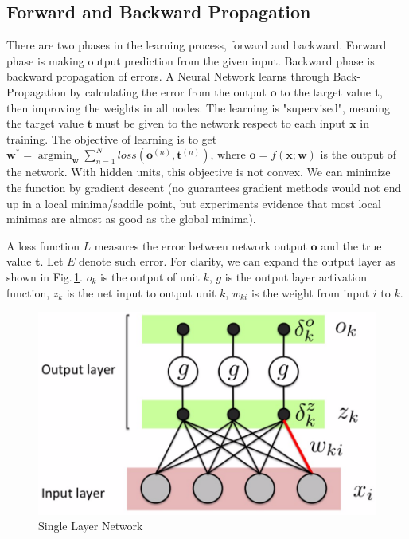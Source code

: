 \newcommand{\argminE}{\mathop{\mathrm{argmin}}}  

\subsection{Forward and Backward Propagation}
There are two phases in the learning process, forward and backward. Forward phase is making output prediction from the given input.
Backward phase is backward propagation of errors. A Neural Network learns through Back-Propagation by calculating the error from the output $\mathbf{o}$ to the target value $\mathbf{t}$, then improving the weights in all nodes. The learning is "supervised", meaning the target value $\mathbf{t}$ must be given to the network respect to each input  $\mathbf{x}$ in training. The objective of learning is to get $\mathbf{w}^* = \argminE_\mathbf{w} \sum_{n=1}^N loss(\mathbf{o}^{(n)},\mathbf{t}^{(n)})$, where $\mathbf{o} = f(\mathbf{x};\mathbf{w})$ is the output of the network. With hidden units, this objective is not convex. We can minimize the function by gradient descent (no guarantees gradient methods would not end up in a local minima/saddle point, but experiments evidence that most local minimas are almost as good as the global minima).

A loss function $L$ measures the error between network output $\mathbf{o}$ and the true value $\mathbf{t}$. Let $E$ denote such error. For clarity, we can expand the output layer as shown in Fig.\,\ref{expand2}. $o_k$ is the output of unit $k$, $g$ is the output layer activation function, $z_{k}$ is the net input to output unit $k$, $w_{ki}$ is the weight from input $i$ to $k$. 

\begin{figure}[h]
	\centering
	\includegraphics[scale=0.5]{Figs/singlelayer2.png}
    \caption{Single Layer Network}
    \label{expand2}
\end{figure}


